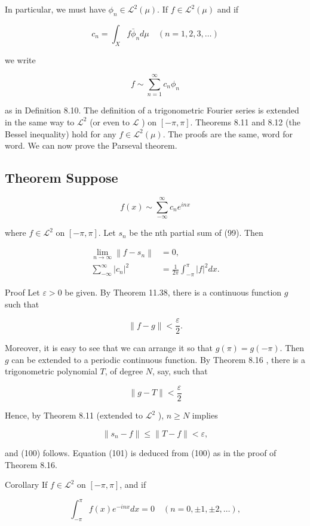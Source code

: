 \documentclass[10pt]{article}
\begin{document}
In particular, we must have $\phi_{n} \in \mathscr{L}^{2}(\mu)$. If $f \in \mathscr{L}^{2}(\mu)$ and if

$$
c_{n}=\int_{X} f \bar{\phi}_{n} d \mu \quad(n=1,2,3, \ldots)
$$

we write

$$
f \sim \sum_{n=1}^{\infty} c_{n} \phi_{n}
$$

as in Definition 8.10. The definition of a trigonometric Fourier series is extended in the same way to $\mathscr{L}^{2}$ (or even to $\mathscr{L}$ ) on $[-\pi, \pi]$. Theorems 8.11 and 8.12 (the Bessel inequality) hold for any $f \in \mathscr{L}^{2}(\mu)$. The proofs are the same, word for word. We can now prove the Parseval theorem.

\subsection{Theorem Suppose}
$$
f(x) \sim \sum_{-\infty}^{\infty} c_{n} e^{i n x}
$$

where $f \in \mathscr{L}^{2}$ on $[-\pi, \pi]$. Let $s_{n}$ be the nth partial sum of (99). Then

$$
\begin{aligned}
\lim _{n \rightarrow \infty}\left\|f-s_{n}\right\| & =0, \\
\sum_{-\infty}^{\infty}\left|c_{n}\right|^{2} & =\frac{1}{2 \pi} \int_{-\pi}^{\pi}|f|^{2} d x .
\end{aligned}
$$

Proof Let $\varepsilon>0$ be given. By Theorem 11.38, there is a continuous function $g$ such that

$$
\|f-g\|<\frac{\varepsilon}{2} .
$$

Moreover, it is easy to see that we can arrange it so that $g(\pi)=g(-\pi)$. Then $g$ can be extended to a periodic continuous function. By Theorem 8.16 , there is a trigonometric polynomial $T$, of degree $N$, say, such that

$$
\|g-T\|<\frac{\varepsilon}{2}
$$

Hence, by Theorem 8.11 (extended to $\mathscr{L}^{2}$ ), $n \geq N$ implies

$$
\left\|s_{n}-f\right\| \leq\|T-f\|<\varepsilon,
$$

and (100) follows. Equation (101) is deduced from (100) as in the proof of Theorem 8.16.

Corollary If $f \in \mathscr{L}^{2}$ on $[-\pi, \pi]$, and if

$$
\int_{-\pi}^{\pi} f(x) e^{-i n x} d x=0 \quad(n=0, \pm 1, \pm 2, \ldots),
$$
\end{document}
